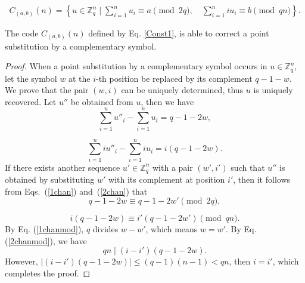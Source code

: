 \documentclass[10pt,a4paper]{amsart}
\begin{document}
\begin{align}\label{Const1}
	C_{(a,b)}(n) = \left \{ u\in \mathbb{Z}_{q}^{n}\mid\sum_{i=1}^{n}u_{i} \equiv a \pmod {2q} ,\quad \sum_{i=1}^{n}iu_{i} \equiv b\pmod{qn}  \right \}. 
\end{align}

\begin{theorem}
The code $C_{(a,b)}(n)$ defined by Eq. \eqref{Const1}, is able to correct a point substitution by a complementary symbol.
\end{theorem}

\begin{proof}
When a point substitution by a complementary symbol occurs in $u \in \mathbb{Z}_{q}^{n}$, let the symbol $w$ at the $i$-th position be replaced by its complement $q-1-w$. We prove that the pair $(w,i)$ can be uniquely determined, thus $u$ is uniquely recovered. Let $u''$ be obtained from $u$, then we have
\begin{equation}\label{1chan}
\sum_{i=1}^{n}u''_{i}-\sum_{i=1}^{n}u_{i}=q-1-2w,
\end{equation}

\begin{equation}\label{2chan}
	 \sum_{i=1}^{n}iu''_{i}- \sum_{i=1}^{n}iu_{i}=i(q-1-2w).
\end{equation}
If there exists another sequence $u' \in \mathbb{Z}_{q}^{n}$ with a pair $(w',i')$ such that $u''$ is obtained by substituting $w'$ with its complement at position $i'$, then it follows from Eqs.~(\ref{1chan}) and~(\ref{2chan}) that
\begin{equation}\label{1chanmod}
q-1-2w \equiv q-1-2w'\pmod{2q},
\end{equation}

\begin{equation}\label{2chanmod}
	i(q-1-2w) \equiv i'(q-1-2w')\pmod{qn}.
\end{equation}
By Eq. (\ref{1chanmod}), $q$ divides $w-w'$, which means $w=w'$. By Eq. (\ref{2chanmod}), we have 
\begin{equation}
qn\mid	(i-i')(q-1-2w). 
\end{equation}
However, $\left |  (i-i')(q-1-2w) \right |  \le (q-1)(n-1)<qn$, then $i=i'$, which completes the proof.
\end{proof}
\end{document}
